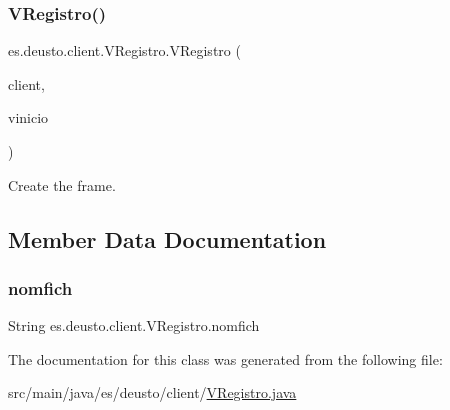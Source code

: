 \subsubsection{\texorpdfstring{VRegistro()}{VRegistro()}}
{\footnotesize\ttfamily es.\+deusto.\+client.\+V\+Registro.\+V\+Registro (\begin{DoxyParamCaption}\item[{\mbox{\hyperlink{classes_1_1deusto_1_1client_1_1_client}{Client}}}]{client,  }\item[{\mbox{\hyperlink{classes_1_1deusto_1_1client_1_1_v_inicio}{V\+Inicio}}}]{vinicio }\end{DoxyParamCaption})}

Create the frame. 

\subsection{Member Data Documentation}
\mbox{\label{classes_1_1deusto_1_1client_1_1_v_registro_aaed4b25a7461d8f707107022b6c9b6e6}} 
\subsubsection{\texorpdfstring{nomfich}{nomfich}}
{\footnotesize\ttfamily String es.\+deusto.\+client.\+V\+Registro.\+nomfich\hspace{0.3cm}{\ttfamily [static]}}



The documentation for this class was generated from the following file\+:\begin{DoxyCompactItemize}
\item 
src/main/java/es/deusto/client/\mbox{\hyperlink{_v_registro_8java}{V\+Registro.\+java}}\end{DoxyCompactItemize}
